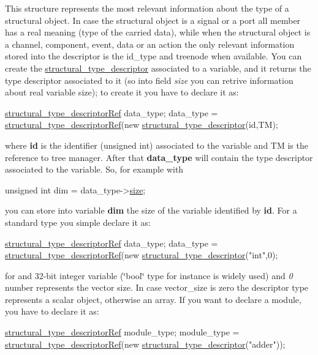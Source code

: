 This structure represents the most relevant information about the type of a structural object. In case the structural object is a signal or a port all member has a real meaning (type of the carried data), while when the structural object is a channel, component, event, data or an action the only relevant information stored into the descriptor is the id\+\_\+type and treenode when available. You can create the \hyperlink{structstructural__type__descriptor}{structural\+\_\+type\+\_\+descriptor} associated to a variable, and it returns the type descriptor associated to it (so into field {\itshape size} you can retrive information about real variable size); to create it you have to declare it as\+: 
\begin{DoxyCode}
\hyperlink{structrefcount}{structural\_type\_descriptorRef} data\_type;
data\_type = \hyperlink{structural__objects_8hpp_a219296792577e3292783725961506c83}{structural\_type\_descriptorRef}(\textcolor{keyword}{new} 
      \hyperlink{structstructural__type__descriptor}{structural\_type\_descriptor}(\textcolor{keywordtype}{id},TM);
\end{DoxyCode}
 where {\bfseries id} is the identifier (unsigned int) associated to the variable and TM is the reference to tree manager. After that {\bfseries data\+\_\+type} will contain the type descriptor associated to the variable. So, for example with 
\begin{DoxyCode}
\textcolor{keywordtype}{unsigned} \textcolor{keywordtype}{int} dim = data\_type->\hyperlink{structstructural__type__descriptor_ac6575b2a1c6a9ee440a58eca5dca2c96}{size};
\end{DoxyCode}
 you can store into variable {\bfseries dim} the size of the variable identified by {\bfseries id}. For a standard type you simple declare it as\+: 
\begin{DoxyCode}
\hyperlink{structrefcount}{structural\_type\_descriptorRef} data\_type;
data\_type = \hyperlink{structural__objects_8hpp_a219296792577e3292783725961506c83}{structural\_type\_descriptorRef}(\textcolor{keyword}{new} 
      \hyperlink{structstructural__type__descriptor}{structural\_type\_descriptor}(\textcolor{stringliteral}{"int"},0);
\end{DoxyCode}
 for and 32-\/bit integer variable (\char`\"{}bool\char`\"{} type for instance is widely used) and {\itshape 0} number represents the vector size. In case vector\+\_\+size is zero the descriptor type represents a scalar object, otherwise an array. If you want to declare a module, you have to declare it as\+: 
\begin{DoxyCode}
\hyperlink{structrefcount}{structural\_type\_descriptorRef} module\_type;
module\_type = \hyperlink{structural__objects_8hpp_a219296792577e3292783725961506c83}{structural\_type\_descriptorRef}(\textcolor{keyword}{new} 
      \hyperlink{structstructural__type__descriptor}{structural\_type\_descriptor}(\textcolor{stringliteral}{"adder"}));
\end{DoxyCode}
